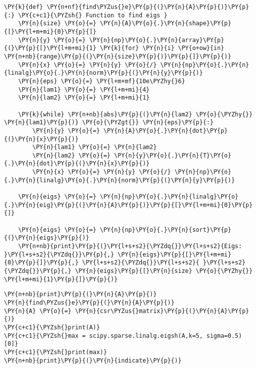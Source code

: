     \begin{tcolorbox}[breakable, size=fbox, boxrule=1pt, pad at break*=1mm,colback=cellbackground, colframe=cellborder]
\begin{Verbatim}[commandchars=\\\{\}]
\PY{k}{def} \PY{n+nf}{find\PYZus{}e}\PY{p}{(}\PY{n}{A}\PY{p}{)}\PY{p}{:} \PY{c+c1}{\PYZsh{} Function to find eigs }
    \PY{n}{size} \PY{o}{=} \PY{n}{A}\PY{o}{.}\PY{n}{shape}\PY{p}{[}\PY{l+m+mi}{0}\PY{p}{]} 
    \PY{n}{y} \PY{o}{=} \PY{n}{np}\PY{o}{.}\PY{n}{array}\PY{p}{(}\PY{p}{[}\PY{l+m+mi}{1} \PY{k}{for} \PY{n}{i} \PY{o+ow}{in} \PY{n+nb}{range}\PY{p}{(}\PY{n}{size}\PY{p}{)}\PY{p}{]}\PY{p}{)} 
    \PY{n}{x} \PY{o}{=} \PY{n}{y} \PY{o}{/} \PY{n}{np}\PY{o}{.}\PY{n}{linalg}\PY{o}{.}\PY{n}{norm}\PY{p}{(}\PY{n}{y}\PY{p}{)} 
    \PY{n}{eps} \PY{o}{=} \PY{l+m+mf}{10e\PYZhy{}6} 
    \PY{n}{lam1} \PY{o}{=} \PY{l+m+mi}{4} 
    \PY{n}{lam2} \PY{o}{=} \PY{l+m+mi}{1} 

    \PY{k}{while} \PY{n+nb}{abs}\PY{p}{(}\PY{n}{lam2} \PY{o}{\PYZhy{}} \PY{n}{lam1}\PY{p}{)} \PY{o}{\PYZgt{}} \PY{n}{eps}\PY{p}{:} 
        \PY{n}{y} \PY{o}{=} \PY{n}{A}\PY{o}{.}\PY{n}{dot}\PY{p}{(}\PY{n}{x}\PY{p}{)} 
        \PY{n}{lam1} \PY{o}{=} \PY{n}{lam2} 
        \PY{n}{lam2} \PY{o}{=} \PY{n}{y}\PY{o}{.}\PY{n}{T}\PY{o}{.}\PY{n}{dot}\PY{p}{(}\PY{n}{x}\PY{p}{)} 
        \PY{n}{x} \PY{o}{=} \PY{n}{y} \PY{o}{/} \PY{n}{np}\PY{o}{.}\PY{n}{linalg}\PY{o}{.}\PY{n}{norm}\PY{p}{(}\PY{n}{y}\PY{p}{)} 

    \PY{n}{eigs} \PY{o}{=} \PY{n}{np}\PY{o}{.}\PY{n}{linalg}\PY{o}{.}\PY{n}{eig}\PY{p}{(}\PY{n}{A}\PY{p}{)}\PY{p}{[}\PY{l+m+mi}{0}\PY{p}{]} 

    \PY{n}{eigs} \PY{o}{=} \PY{n}{np}\PY{o}{.}\PY{n}{sort}\PY{p}{(}\PY{n}{eigs}\PY{p}{)} 
    \PY{n+nb}{print}\PY{p}{(}\PY{l+s+s2}{\PYZdq{}}\PY{l+s+s2}{Eigs: }\PY{l+s+s2}{\PYZdq{}}\PY{p}{,} \PY{n}{eigs}\PY{p}{[}\PY{l+m+mi}{0}\PY{p}{]}\PY{p}{,} \PY{l+s+s2}{\PYZdq{}}\PY{l+s+s2}{ }\PY{l+s+s2}{\PYZdq{}}\PY{p}{,} \PY{n}{eigs}\PY{p}{[}\PY{n}{size} \PY{o}{\PYZhy{}} \PY{l+m+mi}{1}\PY{p}{]}\PY{p}{)}
\end{Verbatim}
\end{tcolorbox}

    \begin{tcolorbox}[breakable, size=fbox, boxrule=1pt, pad at break*=1mm,colback=cellbackground, colframe=cellborder]
\begin{Verbatim}[commandchars=\\\{\}]
\PY{n+nb}{print}\PY{p}{(}\PY{n}{A}\PY{p}{)}
\PY{n}{find\PYZus{}e}\PY{p}{(}\PY{n}{A}\PY{p}{)}
\PY{n}{A} \PY{o}{=} \PY{n}{csr\PYZus{}matrix}\PY{p}{(}\PY{n}{A}\PY{p}{)}
\PY{c+c1}{\PYZsh{}print(A)}
\PY{c+c1}{\PYZsh{}max = scipy.sparse.linalg.eigsh(A,k=5, sigma=0.5)[0]}
\PY{c+c1}{\PYZsh{}print(max)}
\PY{n+nb}{print}\PY{p}{(}\PY{n}{indicate}\PY{p}{)}
\end{Verbatim}
\end{tcolorbox}

